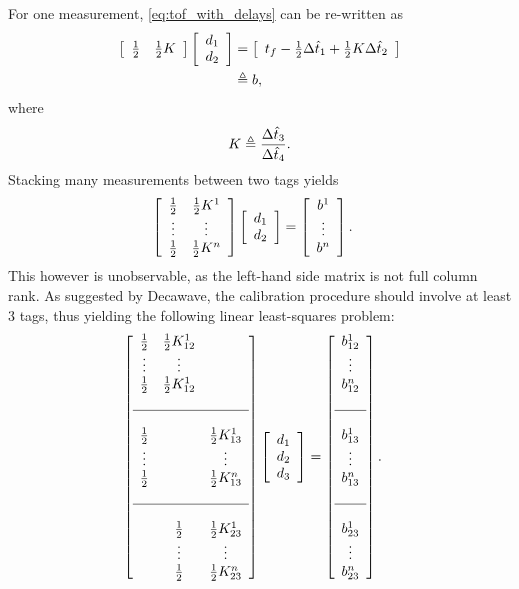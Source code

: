 \documentclass{decar-wsd}    %
\begin{document}
For one measurement, \eqref{eq:tof_with_delays} can be re-written as
\begin{align}
    \bma{cc} \f{1}{2} & \f{1}{2}K \ema \bma{c} d_1 \\ d_2 \ema &= \bma{c} t_f - \f{1}{2} \Delta \hat{t}_1 + \f{1}{2} K \Delta \hat{t}_2 \ema \\
    &\triangleq b,
\end{align}
where 
\begin{equation}
    K \triangleq \f{ \Delta \hat{t}_3}{\Delta \hat{t}_4}.
\end{equation}
Stacking many measurements between two tags yields
\begin{align}
    \bma{cc} \f{1}{2} & \f{1}{2}K^1 \\ \vdots & \vdots \\ \f{1}{2} & \f{1}{2}K^n \ema \bma{c} d_1 \\ d_2 \ema &= \bma{c} b^1 \\ \vdots \\ b^n \ema.
\end{align}
This however is unobservable, as the left-hand side matrix is not full column rank. As suggested by Decawave, the calibration procedure should involve at least 3 tags, thus yielding the following linear least-squares problem:
\begin{align}
    \bma{ccc} \f{1}{2} & \f{1}{2}K^1_{12} &  \\ \vdots & \vdots &  \\ \f{1}{2} & \f{1}{2}K^1_{12} & \\ \\ \hline \\ \f{1}{2} & & \f{1}{2}K^1_{13} \\ \vdots &  & \vdots \\ \f{1}{2} & & \f{1}{2}K^n_{13} \\ \\ \hline \\ & \f{1}{2} & \f{1}{2}K^1_{23} \\ & \vdots & \vdots \\ & \f{1}{2} & \f{1}{2}K^n_{23} \ema \bma{c} d_1 \\ d_2 \\ d_3 \ema &= \bma{c} b_{12}^1 \\ \vdots \\ b_{12}^n \\ \\ \hline \\ b_{13}^1 \\ \vdots \\ b_{13}^n \\ \\ \hline \\ b_{23}^1 \\ \vdots \\ b_{23}^n \ema.
\end{align}
\end{document}
